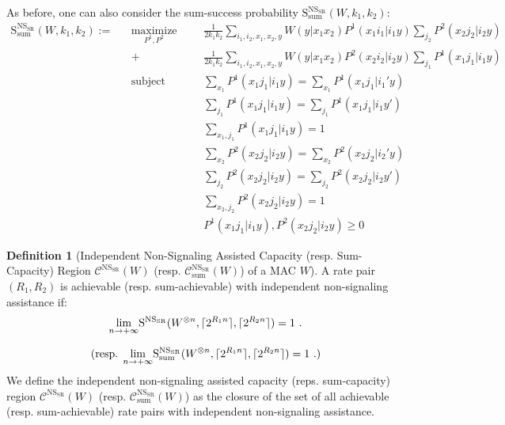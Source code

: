 \documentclass[11pt]{article}
\theoremstyle{definition}
\newtheorem{defi}[theo]{Definition}
\theoremstyle{remark}
\DeclareMathOperator{\maxi}{\text{maximize}}
\DeclareMathOperator{\st}{\text{subject to}}
\DeclarePairedDelimiter\ceil{\lceil}{\rceil}
\begin{document}
As before, one can also consider the sum-success probability $\mathrm{S}_{\text{sum}}^{\mathrm{NS}_{\mathrm{SR}}}(W,k_1,k_2)$:
\begin{equation}
  \begin{aligned}
    \mathrm{S}_{\text{sum}}^{\mathrm{NS}_{\mathrm{SR}}}(W,k_1,k_2) := &&\underset{P^1, P^2}{\maxi} &&& \frac{1}{2k_1k_2} \sum_{i_1,i_2,x_1,x_2,y} W(y|x_1x_2)P^1(x_1i_1|i_1y)\sum_{j_2}P^2(x_2j_2|i_2y)\\
    &&+&&& \frac{1}{2k_1k_2} \sum_{i_1,i_2,x_1,x_2,y} W(y|x_1x_2)P^2(x_2i_2|i_2y)\sum_{j_1}P^1(x_1j_1|i_1y)\\
    &&\st &&& \sum_{x_1} P^1(x_1j_1|i_1y) = \sum_{x_1} P^1(x_1j_1|i_1'y)\\
    &&&&& \sum_{j_1} P^1(x_1j_1|i_1y) = \sum_{j_1} P^1(x_1j_1|i_1y')\\
    &&&&& \sum_{x_1,j_1} P^1(x_1j_1|i_1y) = 1\\
    &&&&& \sum_{x_2} P^2(x_2j_2|i_2y) = \sum_{x_2} P^2(x_2j_2|i_2'y)\\
    &&&&& \sum_{j_2} P^2(x_2j_2|i_2y) = \sum_{j_2} P^2(x_2j_2|i_2y')\\
    &&&&& \sum_{x_2,j_2} P^2(x_2j_2|i_2y) = 1\\
    &&&&& P^1(x_1j_1|i_1y), P^2(x_2j_2|i_2y) \geq 0
  \end{aligned}
\end{equation}

\begin{defi}[Independent Non-Signaling Assisted Capacity (resp. Sum-Capacity) Region $\mathcal{C}^{\mathrm{NS}_{\mathrm{SR}}}(W)$ (resp. $\mathcal{C}_{\text{sum}}^{\mathrm{NS}_{\mathrm{SR}}}(W)$)  of a MAC $W$]
  A rate pair $(R_1,R_2)$ is achievable (resp. sum-achievable) with independent non-signaling assistance if:
  \[ \underset{n \rightarrow +\infty}{\lim} \mathrm{S}^{\mathrm{NS}_{\mathrm{SR}}}(W^{\otimes n},\ceil{2^{R_1n}},\ceil{2^{R_2n}}) = 1 \ . \]

   \[ (\text{resp. }\underset{n \rightarrow +\infty}{\lim} \mathrm{S}_{\text{sum}}^{\mathrm{NS}_{\mathrm{SR}}}(W^{\otimes n},\ceil{2^{R_1n}},\ceil{2^{R_2n}}) = 1 \ .) \]
  We define the independent non-signaling assisted capacity (reps. sum-capacity) region $\mathcal{C}^{\mathrm{NS}_{\mathrm{SR}}}(W)$ (resp. $\mathcal{C}_{\text{sum}}^{\mathrm{NS}_{\mathrm{SR}}}(W)$) as the closure of the set of all achievable (resp. sum-achievable) rate pairs with independent non-signaling assistance.
\end{defi}
\end{document}
